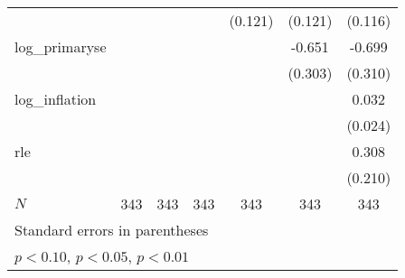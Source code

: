 {\begin{tabular}{l*{6}{c}}
            &                     &                     &                     &     (0.121)         &     (0.121)         &     (0.116)         \\
\addlinespace
log\_primaryse&                     &                     &                     &                     &      -0.651\sym{**} &      -0.699\sym{**} \\
            &                     &                     &                     &                     &     (0.303)         &     (0.310)         \\
\addlinespace
log\_inflation&                     &                     &                     &                     &                     &       0.032         \\
            &                     &                     &                     &                     &                     &     (0.024)         \\
\addlinespace
rle         &                     &                     &                     &                     &                     &       0.308         \\
            &                     &                     &                     &                     &                     &     (0.210)         \\
\midrule
\(N\)       &         343         &         343         &         343         &         343         &         343         &         343         \\
\bottomrule
\multicolumn{7}{l}{\footnotesize Standard errors in parentheses}\\
\multicolumn{7}{l}{\footnotesize \sym{*} \(p<0.10\), \sym{**} \(p<0.05\), \sym{***} \(p<0.01\)}\\
\end{tabular}
}
